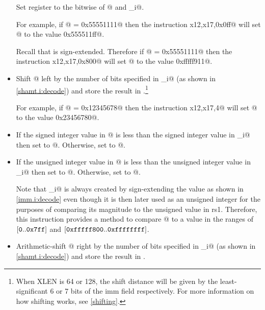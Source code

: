 \begin{itemize}
Set register \verb@rd@ to the bitwise \verb@or@ of @ and \verb@imm_i@.

For example, if @ = \verb@0x55551111@ then the instruction 
\verb@ori x12,x17,0x0ff@ will set @ to the value \verb@0x555511ff@.

Recall that \verb@imm@ is sign-extended.
Therefore if @ = \verb@0x55551111@ then the instruction 
\verb@ori x12,x17,0x800@ will set @ to the value \verb@0xfffff911@.

\item{}
\label{insn:slli}

Shift @ left by the number of bits specified in \verb@shamt_i@ 
(as shown in \autoref{shamt.i:decode})
and store the result in \verb@rd@.\footnote{\label{shifti:xlen}
When XLEN is 64 or 128, the shift distance will be given by the least-significant 
6 or 7 bits of the imm field respectively. 
For more information on how shifting works, see \autoref{shifting}.}

For example, if @ = \verb@0x12345678@ then the instruction 
\verb@slli x12,x17,4@ will set @ to the value \verb@0x23456780@.

\item{}
\label{insn:slti}

If the signed integer value in @ is less than the
signed integer value in \verb@imm_i@ then set \verb@rd@ to @.
Otherwise, set \verb@rd@ to @.

\item{}
\label{insn:sltiu}

If the unsigned integer value in @ is less than the
unsigned integer value in \verb@imm_i@ then set \verb@rd@ to @.
Otherwise, set \verb@rd@ to @.

Note that \verb@imm_i@ is always created by sign-extending the \verb@imm@ value 
as shown in \autoref{imm.i:decode} even though it is then later used as an unsigned 
integer for the purposes of comparing its magnitude to the unsigned value in rs1.  
Therefore, this instruction provides a method to compare @ to a value 
in the ranges of 
$[\text{\tt 0}..\text{\tt 0x7ff}]$ and $[\text{\tt 0xfffff800}..\text{\tt 0xffffffff}]$.

\item{}
\label{insn:srai}

Arithmetic-shift @ right by the number of bits specified in \verb@shamt_i@ 
(as shown in \autoref{shamt.i:decode})
and store the result in \verb@rd@.


\end{itemize}
